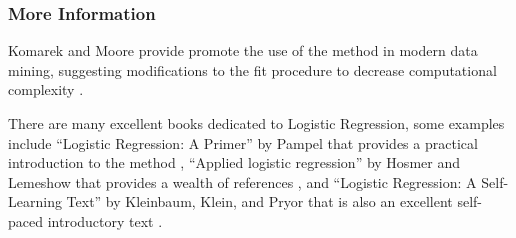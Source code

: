 \subsubsection{More Information}
Komarek and Moore provide promote the use of the method in modern data mining, suggesting modifications to the fit procedure to decrease computational complexity \cite{Komarek2005}.

There are many excellent books dedicated to Logistic Regression, some examples include 
``Logistic Regression: A Primer'' by Pampel that provides a practical introduction to the method \cite{Pampel2000}, ``Applied logistic regression'' by Hosmer and Lemeshow that provides a wealth of references \cite{Hosmer2000}, and ``Logistic Regression: A Self-Learning Text'' by Kleinbaum, Klein, and Pryor that is also an excellent self-paced introductory text \cite{Kleinbaum2010}.


